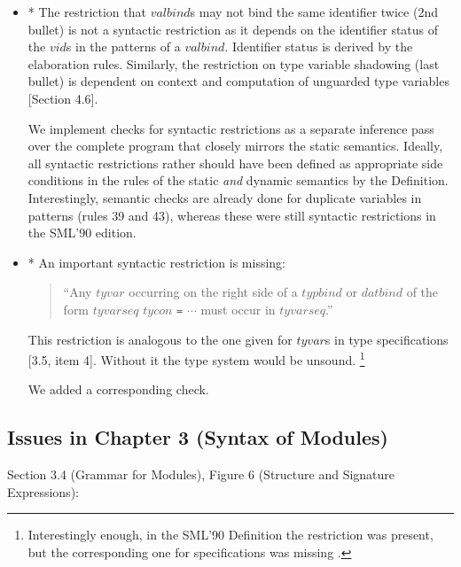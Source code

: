 \documentclass[twoside,titlepage]{article}
\begin{document}
\begin{appendix}
\begin{itemize}

\item * The restriction that $\mathit{valbind}$s may not bind the same identifier twice (2nd bullet) is not a syntactic restriction as it depends on the identifier status of the $\mathit{vid}$s in the patterns of a $\mathit{valbind}$. Identifier status is derived by the elaboration rules. Similarly, the restriction on type variable shadowing (last bullet) is dependent on context and computation of unguarded type variables [Section 4.6].

We implement checks for syntactic restrictions as a separate inference pass over the complete program that closely mirrors the static semantics. Ideally, all syntactic restrictions rather should have been defined as appropriate side conditions in the rules of the static \emph{and} dynamic semantics by the Definition.  Interestingly, semantic checks are already done for duplicate variables in patterns (rules 39 and 43), whereas these were still syntactic restrictions in the SML'90 edition.

\item * An important syntactic restriction is missing:

\begin{quote}
``Any $\mathit{tyvar}$ occurring on the right side of a $\mathit{typbind}$ or $\mathit{datbind}$ of the form $\mathit{tyvarseq}$ $\mathit{tycon}$ {\tt =} $\cdots$ must occur in $\mathit{tyvarseq}$.''
\end{quote}

This restriction is analogous to the one given for $\mathit{tyvar}$s in type specifications [3.5, item 4]. Without it the type system would be unsound. \footnote{Interestingly enough, in the SML'90 Definition the restriction was present, but the corresponding one for specifications was missing \cite{commentary, mistakes}.}

We added a corresponding check.

\end{itemize}


\subsection{Issues in Chapter 3 (Syntax of Modules)}
\label{bugschapter3}

Section 3.4 (Grammar for Modules), Figure 6 (Structure and Signature Expressions):

\begin{itemize}


\end{itemize}
\end{appendix}
\end{document}
